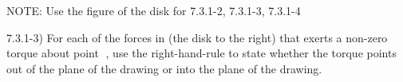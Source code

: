 \label{fnt7.3.1-3}

NOTE: Use the figure of the disk for \FNTs{} 7.3.1-2, 7.3.1-3, 7.3.1-4

7.3.1-3) For each of the forces in (the disk to the right) that exerts a non-zero torque about point , use the right-hand-rule to state whether the torque points out of the plane of the drawing or into the plane of the drawing.